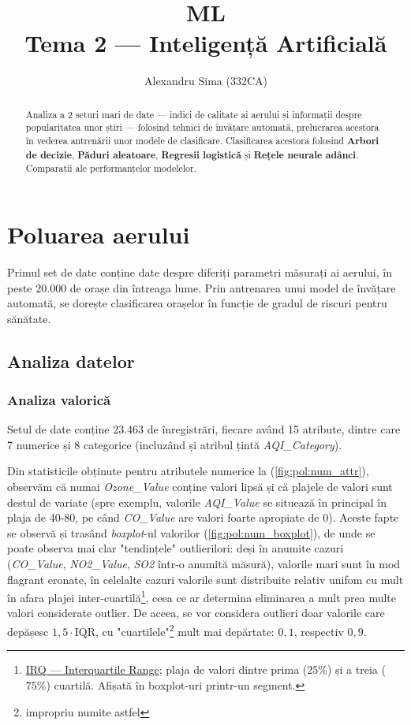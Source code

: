 \documentclass{article}
\title{{\huge ML}\\ Tema 2 --- Inteligență Artificială}
\author{Alexandru Sima (332CA)}
\begin{document}
\maketitle
\begin{abstract}
    Analiza a 2 seturi mari de date --- indici de calitate ai aerului și 
    informații despre popularitatea unor știri --- folosind tehnici de învățare
    automată, prelucrarea acestora în vederea antrenării unor modele de 
    clasificare. Clasificarea acestora folosind \textbf{Arbori de decizie}, 
    \textbf{Păduri aleatoare}, \textbf{Regresii logistică} și \textbf{Rețele 
    neurale adânci}. Comparații ale performanțelor modelelor.
\end{abstract}

\newpage
\tableofcontents

\newpage
\section{Poluarea aerului}
Primul set de date conține date despre diferiți parametri măsurați ai aerului,
în peste $20.000$ de orașe din întreaga lume. Prin antrenarea unui model de
învățare automată, se dorește clasificarea orașelor în funcție de gradul de 
riscuri pentru sănătate.

\subsection{Analiza datelor}
\subsubsection{Analiza valorică}
Setul de date conține $23.463$ de înregistrări, fiecare având 15 atribute, 
dintre care 7 numerice și 8 categorice (incluzând și atribul țintă 
\textit{AQI\_Category}).

Din statisticile obținute pentru atributele numerice la (\ref{fig:pol:num_attr}), 
observăm că numai \textit{Ozone\_Value} conține valori lipsă și că plajele de 
valori sunt destul de variate (spre exemplu, valorile \textit{AQI\_Value} se 
situează în principal în plaja de 40-80, pe când \textit{CO\_Value} are valori 
foarte apropiate de 0). Aceste fapte se observă și trasând \textit{boxplot}-ul
valorilor (\ref{fig:pol:num_boxplot}), de unde se poate observa mai clar 
"tendințele" outlierilori: deși în anumite cazuri (\textit{CO\_Value}, 
\textit{NO2\_Value}, \textit{SO2} într-o anumită măsură), valorile mari sunt în
mod flagrant eronate, în celelalte cazuri valorile sunt distribuite relativ 
unifom cu mult în afara plajei inter-cuartilă\footnote{
    \href{https://en.wikipedia.org/wiki/Interquartile_range}{IRQ --- 
    Interquartile Range}; plaja de valori dintre prima ($25\%$) și a treia 
    ($75\%$) cuartilă. Afișată în boxplot-uri printr-un segment.
}, ceea ce ar determina eliminarea a mult prea multe valori considerate outlier.
De aceea, se vor considera outlieri doar valorile care depășesc 
$1,5 \cdot \text{IQR}$, cu "cuartilele"\footnote{impropriu numite astfel} mult 
mai depărtate: $0,1$, respectiv $0,9$.
\end{document}
